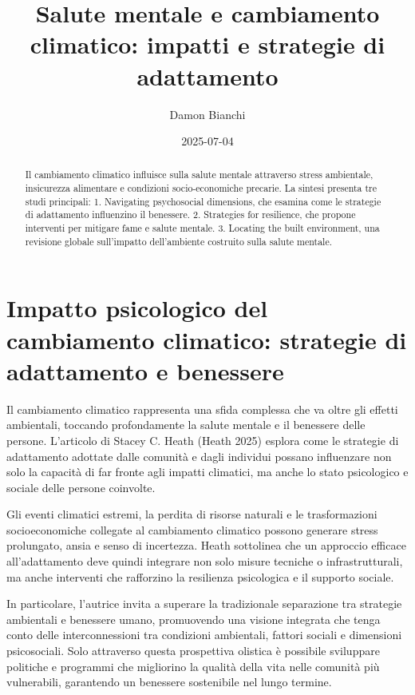 \documentclass[
]{article}
\title{Salute mentale e cambiamento climatico: impatti e strategie di
adattamento}
\author{Damon Bianchi}
\date{2025-07-04}
\begin{document}
\maketitle
\begin{abstract}
Il cambiamento climatico influisce sulla salute mentale attraverso
stress ambientale, insicurezza alimentare e condizioni socio-economiche
precarie. La sintesi presenta tre studi principali: 1. Navigating
psychosocial dimensions, che esamina come le strategie di adattamento
influenzino il benessere. 2. Strategies for resilience, che propone
interventi per mitigare fame e salute mentale. 3. Locating the built
environment, una revisione globale sull'impatto dell'ambiente costruito
sulla salute mentale.
\end{abstract}

\section{Impatto psicologico del cambiamento climatico: strategie di
adattamento e
benessere}\label{impatto-psicologico-del-cambiamento-climatico-strategie-di-adattamento-e-benessere}

Il cambiamento climatico rappresenta una sfida complessa che va oltre
gli effetti ambientali, toccando profondamente la salute mentale e il
benessere delle persone. L'articolo di Stacey C. Heath (Heath 2025)
esplora come le strategie di adattamento adottate dalle comunità e dagli
individui possano influenzare non solo la capacità di far fronte agli
impatti climatici, ma anche lo stato psicologico e sociale delle persone
coinvolte.

Gli eventi climatici estremi, la perdita di risorse naturali e le
trasformazioni socioeconomiche collegate al cambiamento climatico
possono generare stress prolungato, ansia e senso di incertezza. Heath
sottolinea che un approccio efficace all'adattamento deve quindi
integrare non solo misure tecniche o infrastrutturali, ma anche
interventi che rafforzino la resilienza psicologica e il supporto
sociale.

In particolare, l'autrice invita a superare la tradizionale separazione
tra strategie ambientali e benessere umano, promuovendo una visione
integrata che tenga conto delle interconnessioni tra condizioni
ambientali, fattori sociali e dimensioni psicosociali. Solo attraverso
questa prospettiva olistica è possibile sviluppare politiche e programmi
che migliorino la qualità della vita nelle comunità più vulnerabili,
garantendo un benessere sostenibile nel lungo termine.
\end{document}

